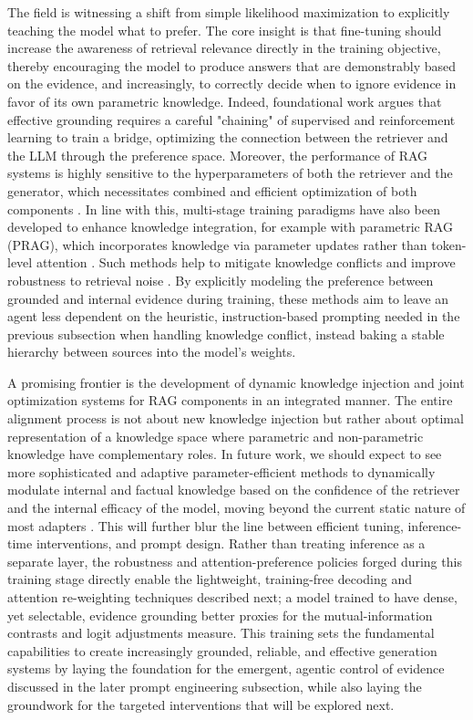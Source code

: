 \documentclass[11pt,a4paper]{article}
\begin{document}
The field is witnessing a shift from simple likelihood maximization to explicitly teaching the model what to prefer. The core insight is that fine-tuning should increase the awareness of retrieval relevance directly in the training objective, thereby encouraging the model to produce answers that are demonstrably based on the evidence, and increasingly, to correctly decide when to ignore evidence in favor of its own parametric knowledge. Indeed, foundational work \cite{arxiv:2401.06954v2} argues that effective grounding requires a careful "chaining" of supervised and reinforcement learning to train a bridge, optimizing the connection between the retriever and the LLM through the preference space. Moreover, the performance of RAG systems is highly sensitive to the hyperparameters of both the retriever and the generator, which necessitates combined and efficient optimization of both components \cite{arxiv:2605.08333v1}. In line with this, multi-stage training paradigms have also been developed to enhance knowledge integration, for example with parametric RAG (PRAG), which incorporates knowledge via parameter updates rather than token-level attention \cite{arxiv:2501.15915v1}. Such methods help to mitigate knowledge conflicts and improve robustness to retrieval noise \cite{arxiv:2510.12668v2}. By explicitly modeling the preference between grounded and internal evidence during training, these methods aim to leave an agent less dependent on the heuristic, instruction-based prompting needed in the previous subsection when handling knowledge conflict, instead baking a stable hierarchy between sources into the model's weights.

A promising frontier is the development of dynamic knowledge injection and joint optimization systems for RAG components in an integrated manner. The entire alignment process is not about new knowledge injection but rather about optimal representation of a knowledge space where parametric and non-parametric knowledge have complementary roles. In future work, we should expect to see more sophisticated and adaptive parameter-efficient methods to dynamically modulate internal and factual knowledge based on the confidence of the retriever and the internal efficacy of the model, moving beyond the current static nature of most adapters \cite{arxiv:2510.12668v2}. This will further blur the line between efficient tuning, inference-time interventions, and prompt design. Rather than treating inference as a separate layer, the robustness and attention-preference policies forged during this training stage directly enable the lightweight, training-free decoding and attention re-weighting techniques described next; a model trained to have dense, yet selectable, evidence grounding better proxies for the mutual-information contrasts and logit adjustments measure. This training sets the fundamental capabilities to create increasingly grounded, reliable, and effective generation systems by laying the foundation for the emergent, agentic control of evidence discussed in the later prompt engineering subsection, while also laying the groundwork for the targeted interventions that will be explored next.
\end{document}
